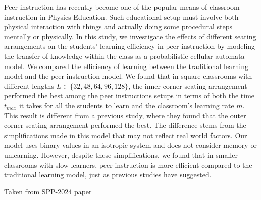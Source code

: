 Peer instruction has recently become one of the popular means of classroom instruction in Physics Education. Such educational setup must involve both physical interaction with things and actually doing some procedural steps mentally or physically. In this study, we investigate the effects of different seating arrangements on the students' learning efficiency in peer instruction by modeling the transfer of knowledge within the class as a probabilistic cellular automata model.  We compared the efficiency of learning between the traditional learning model and the peer instruction model. We found that in square classrooms with different lengths $L \in\lbrace32,48,64,96,128\rbrace$, the inner corner seating arrangement performed the best among the peer instructions setups in terms of both the time $t_{max}$ it takes for all the students to learn and the classroom’s learning rate $m$. This result is different from a previous study, where they found that the outer corner seating arrangement performed the best. The difference stems from the simplifications made in this model that may not reflect real world factors. Our model uses binary values in an isotropic system and does not consider memory or unlearning. However, despite these simplifications, we found that in smaller classrooms with slow learners, peer instruction is more efficient compared to the traditional learning model, just as previous studies have suggested.

Taken from SPP-2024 paper

